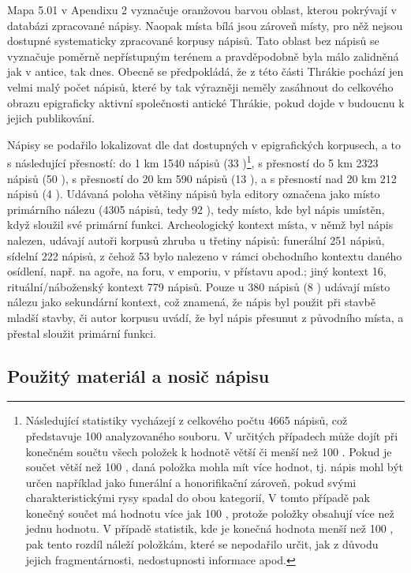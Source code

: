 Mapa 5.01 v Apendixu 2 vyznačuje oranžovou barvou oblast, kterou pokrývají v databázi zpracované nápisy. Naopak místa bílá jsou zároveň místy, pro něž nejsou dostupné systematicky zpracované korpusy nápisů. Tato oblast bez nápisů se vyznačuje poměrně nepřístupným terénem a pravděpodobně byla málo zalidněná jak v antice, tak dnes. Obecně se předpokládá, že z této části Thrákie pochází jen velmi malý počet nápisů, které by tak výrazněji neměly zasáhnout do celkového obrazu epigraficky aktivní společnosti antické Thrákie, pokud dojde v budoucnu k jejich publikování.

Nápisy se podařilo lokalizovat dle dat dostupných v epigrafických korpusech, a to s následující přesností: do 1 km 1540 nápisů (33 )\footnote{Následující statistiky vycházejí z celkového počtu 4665 nápisů, což představuje 100  analyzovaného souboru. V určitých případech může dojít při konečném součtu všech položek k hodnotě větší či menší než 100 . Pokud je součet větší než 100 , daná položka mohla mít více hodnot, tj. nápis mohl být určen například jako funerální a honorifikační zároveň, pokud svými charakteristickými rysy spadal do obou kategorií, V tomto případě pak konečný součet má hodnotu více jak 100 , protože položky obsahují více než jednu hodnotu. V případě statistik, kde je konečná hodnota menší než 100 , pak tento rozdíl náleží položkám, které se nepodařilo určit, jak z důvodu jejich fragmentárnosti, nedostupnosti informace apod.}, s přesností do 5 km 2323 nápisů (50 ), s přesností do 20 km 590 nápisů (13 ), a s přesností nad 20 km 212 nápisů (4 ). Udávaná poloha většiny nápisů byla editory označena jako místo primárního nálezu (4305 nápisů, tedy 92 ), tedy místo, kde byl nápis umístěn, když sloužil své primární funkci. Archeologický kontext místa, v němž byl nápis nalezen, udávají autoři korpusů zhruba u třetiny nápisů: funerální 251 nápisů, sídelní 222 nápisů, z čehož 53 bylo nalezeno v rámci obchodního kontextu daného osídlení, např. na agoře, na foru, v emporiu, v přístavu apod.; jiný kontext 16, rituální/náboženský kontext 779 nápisů. Pouze u 380 nápisů (8 ) udávají místo nálezu jako sekundární kontext, což znamená, že nápis byl použit při stavbě mladší stavby, či autor korpusu uvádí, že byl nápis přesunut z původního místa, a přestal sloužit primární funkci.

\subsection[použitý-materiál-a-nosič-nápisu]{Použitý materiál a nosič nápisu}

